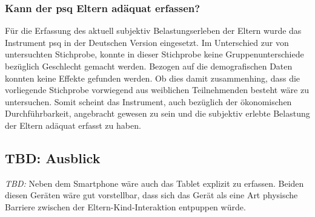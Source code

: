 \subsubsection{Kann der \acrshort{psq} Eltern adäquat erfassen?}
Für die Erfassung des aktuell subjektiv Belastungserleben der Eltern wurde das Instrument \acrfull{psq} in der Deutschen Version eingesetzt. Im Unterschied zur von  untersuchten Stichprobe, konnte in dieser Stichprobe keine Gruppenunterschiede bezüglich Geschlecht gemacht werden. Bezogen auf die demografischen Daten konnten keine Effekte gefunden werden. Ob dies damit zusammenhing, dass die vorliegende Stichprobe vorwiegend aus weiblichen Teilnehmenden besteht wäre zu untersuchen. Somit scheint das Instrument, auch bezüglich der ökonomischen Durchführbarkeit, angebracht gewesen zu sein und die subjektiv erlebte Belastung der Eltern adäquat erfasst zu haben.
   

\subsection{TBD: Ausblick} \label{sec:Ausblick}
\textit{TBD:} Neben dem Smartphone wäre auch das Tablet explizit zu erfassen. Beiden diesen Geräten wäre gut vorstellbar, dass sich das Gerät als eine Art physische Barriere zwischen der Eltern-Kind-Interaktion entpuppen würde.